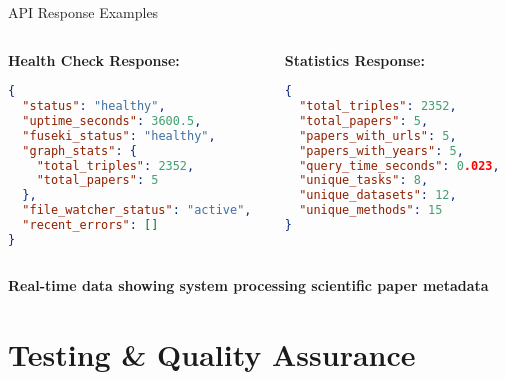\documentclass[aspectratio=169]{beamer}
\begin{document}
\begin{frame}{API Response Examples}
    \begin{columns}[c]
        \begin{column}{0.5\textwidth}
            \textbf{Health Check Response:}
            \begin{lstlisting}[language=json]
{
  "status": "healthy",
  "uptime_seconds": 3600.5,
  "fuseki_status": "healthy",
  "graph_stats": {
    "total_triples": 2352,
    "total_papers": 5
  },
  "file_watcher_status": "active",
  "recent_errors": []
}
            \end{lstlisting}
        \end{column}
        \begin{column}{0.5\textwidth}
            \textbf{Statistics Response:}
            \begin{lstlisting}[language=json]
{
  "total_triples": 2352,
  "total_papers": 5,
  "papers_with_urls": 5,
  "papers_with_years": 5,
  "query_time_seconds": 0.023,
  "unique_tasks": 8,
  "unique_datasets": 12,
  "unique_methods": 15
}
            \end{lstlisting}
        \end{column}
    \end{columns}
    
    \vspace{0.5cm}
    
    \begin{center}
        \textbf{Real-time data showing system processing scientific paper metadata}
    \end{center}
\end{frame}

\section{Testing \& Quality Assurance}
\end{document}
